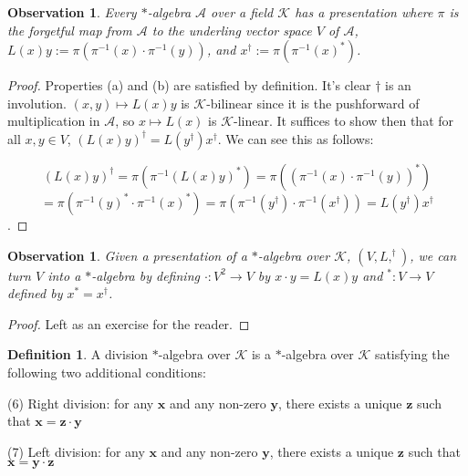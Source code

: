 \documentclass[12pt]{article}
\newtheorem{observation}[theorem]{Observation}
\theoremstyle{definition}
\newtheorem{definition}[theorem]{Definition}
\theoremstyle{remark}
\begin{document}
\begin{observation} Every \(*\)-algebra \(\mathcal{A}\) over a field \(\mathcal{K}\) has a presentation where \(\pi\) is the forgetful map from \(\mathcal{A}\) to the underling vector space \(V\) of \(\mathcal{A}\), \(L(x)y := \pi(\pi^{-1}(x) \cdot \pi^{-1}(y))\), and \(x^{\dagger} := \pi(\pi^{-1}(x)^*)\).
\end{observation}

\begin{proof}
Properties (a) and (b) are satisfied by definition. It's clear \(\dagger\) is an involution. \((x,y) \mapsto L(x)y\) is \(\mathcal{K}\)-bilinear since it is the pushforward of multiplication in \(\mathcal{A}\), so \(x \mapsto L(x)\) is \(\mathcal{K}\)-linear. It suffices to show then that for all \(x,y \in V\), $(L(x)y)^{\dagger} = L(y^{\dagger}) x^{\dagger}$. We can see this as follows:

\[(L(x)y)^{\dagger} = \pi(\pi^{-1}(L(x)y)^*) = \pi((\pi^{-1}(x) \cdot \pi^{-1}(y))^*)\] \[ = \pi(\pi^{-1}(y)^* \cdot \pi^{-1}(x)^*)= \pi(\pi^{-1}(y^{\dagger}) \cdot \pi^{-1}(x^{\dagger})) = L(y^{\dagger})x^{\dagger}\].
\end{proof}

\begin{observation} Given a presentation  of a \(*\)-algebra over \(\mathcal{K}\), \((V, L, ^{\dagger})\), we can turn \(V\) into a \(*\)-algebra by defining \(\cdot : V^2 \rightarrow V\) by \(x \cdot y = L(x)y\) and \(^* : V \rightarrow V\) defined by \(x^* = x^{\dagger}\).
\end{observation}

\begin{proof}
Left as an exercise for the reader.
\end{proof}

\begin{definition}
A division $*$-algebra over $\mathcal{K}$ is a $*$-algebra over $\mathcal{K}$ satisfying the following two additional conditions:

(6) Right division: for any $\mathbf{x}$ and any non-zero $\mathbf{y}$, there exists a unique $\mathbf{z}$ such that $\mathbf{x} = \mathbf{z} \cdot \mathbf{y}$

(7) Left division: for any $\mathbf{x}$ and any non-zero $\mathbf{y}$, there exists a unique $\mathbf{z}$ such that $\mathbf{x} = \mathbf{y} \cdot \mathbf{z}$
\end{definition}
\end{document}
